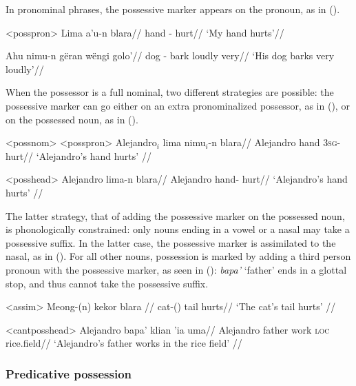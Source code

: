\documentclass[12pt]{article}
\begin{document}
In pronominal phrases, the possessive marker appears on the pronoun, as in ().

\pex<posspron> %
\begingl %
\gla Lima a'u-n blara//
\glb hand {\First{}\Sg{}}-\Poss{} hurt//
\glft `My hand hurts'//
\endgl

\begingl %
\gla Ahu nimu-n gëran wëngi golo'//
\glb dog \Third{}\Sg{}-\Poss{} bark loudly very//
\glft `His dog barks very loudly'// 
\endgl
\xe

When the possessor is a full nominal, two different strategies are possible: the possessive marker can go either on an extra pronominalized possessor, as in (), or on the possessed noun, as in ().

\pex<possnom> %
\a<posspron> %
\begingl %
\gla Alejandro$_i$ lima nimu$_i$-n blara//
\glb Alejandro hand 3\textsc{sg}-\Poss{} hurt//
\glft `Alejandro's hand hurts' // 
\endgl

\a<posshead> %
\begingl %
\gla Alejandro lima-n blara//
\glb Alejandro hand-\Poss{} hurt//
\glft `Alejandro's hand hurts' // 
\endgl
\xe

The latter strategy, that of adding the possessive marker on the possessed noun, is phonologically constrained: only  nouns ending in a vowel or a nasal may take a possessive suffix. In the latter case, the possessive marker is assimilated to the nasal, as in (). For all other nouns, possession is marked by adding a third person pronoun with the possessive marker, as seen in (): \textit{bapa'} `father' ends in a glottal stop, and thus cannot take the possessive suffix.

\ex<assim> %
\begingl %
\gla Meong-(n) kekor blara //
\glb cat-(\Poss{}) tail hurts//
\glft `The cat's tail hurts' // 
\endgl
\xe

\ex<cantposshead>
\begingl %
\gla Alejandro bapa' klian 'ia uma//
\glb Alejandro father work \textsc{loc} rice.field//
\glft `Alejandro's father works in the rice field' // 
\endgl
\xe

\subsubsection{Predicative possession}
\end{document}
